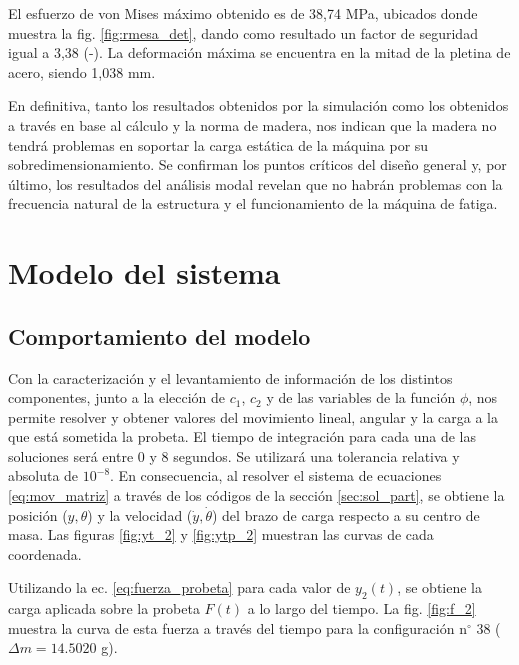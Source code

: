 El esfuerzo de von Mises máximo obtenido es de 38,74 MPa, ubicados donde muestra la fig. \ref{fig:rmesa_det}, dando como resultado un factor de seguridad igual a 3,38 (-). La deformación máxima se encuentra en la mitad de la pletina de acero, siendo 1,038 mm.

En definitiva, tanto los resultados obtenidos por la simulación como los obtenidos a través en base al cálculo y la norma de madera, nos indican que la madera no tendrá problemas en soportar la carga estática de la máquina por su sobredimensionamiento. Se confirman los puntos críticos del diseño general y, por último, los resultados del análisis modal revelan que no habrán problemas con la frecuencia natural de la estructura y el funcionamiento de la máquina de fatiga.

\section{Modelo del sistema}

\subsection{Comportamiento del modelo}
Con la caracterización y el levantamiento de información de los distintos componentes, junto a la elección de $c_1$, $c_2$ y de las variables de la función $\phi$, nos permite resolver y obtener valores del movimiento lineal, angular y la carga a la que está sometida la probeta. El tiempo de integración para cada una de las soluciones será entre 0 y 8 segundos. Se utilizará una tolerancia relativa y absoluta de $10^{-8}$. En consecuencia, al resolver el sistema de ecuaciones \ref{eq:mov_matriz} a través de los códigos de la sección \ref{sec:sol_part}, se obtiene la posición ($y,\theta$) y la velocidad ($\dot{y},\dot{\theta}$) del brazo de carga respecto a su centro de masa. Las figuras \ref{fig:yt_2} y \ref{fig:ytp_2} muestran las curvas de cada coordenada.

Utilizando la ec. \ref{eq:fuerza_probeta} para cada valor de $y_2(t)$, se obtiene la carga aplicada sobre la probeta $F(t)$ a lo largo del tiempo. La fig. \ref{fig:f_2} muestra la curva de esta fuerza a través del tiempo para la configuración n$^{\circ}$ 38 ($\Delta m = 14.5020$ g).

